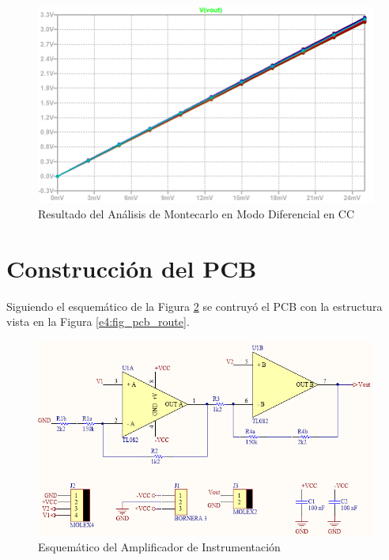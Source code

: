 \begin{figure}[!ht]
\begin{center}
\includegraphics[width=0.85\linewidth]{res/spice/spice_dm_dc_mc.png}
\caption{Resultado del Análisis de Montecarlo en Modo Diferencial en CC}
\label{e4:fig_spice_dm_dc_mc}
\end{center}
\end{figure}

\pagebreak
\pagebreak
\pagebreak

\section{Construcción del PCB}

Siguiendo el esquemático de la Figura \ref{e4:fig_pcb_sch} se contruyó el PCB con la estructura vista en la Figura \ref{e4:fig_pcb_route}.

\begin{figure}[!ht]
\begin{center}
\includegraphics[width=0.7\linewidth]{res/altium/sch.png}
\caption{Esquemático del Amplificador de Instrumentación}
\label{e4:fig_pcb_sch}
\end{center}
\end{figure}

